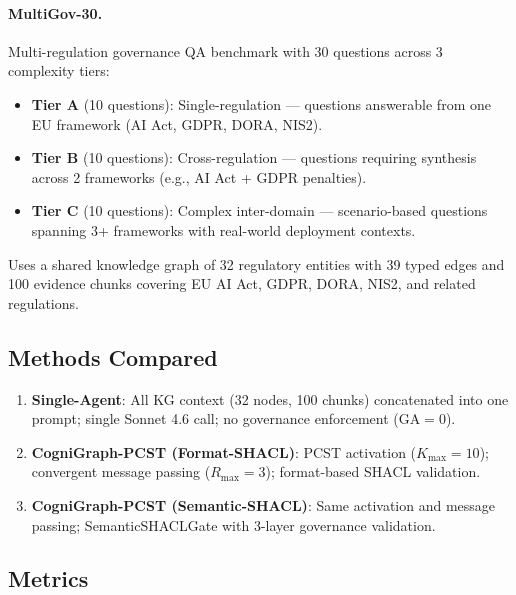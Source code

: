 \documentclass[a4paper,11pt]{article}
\theoremstyle{definition}
\begin{document}
\paragraph{MultiGov-30.}
Multi-regulation governance QA benchmark with 30 questions across 3 complexity tiers:
\begin{itemize}
\item \textbf{Tier A} (10 questions): Single-regulation --- questions answerable from one EU framework (AI Act, GDPR, DORA, NIS2).
\item \textbf{Tier B} (10 questions): Cross-regulation --- questions requiring synthesis across 2 frameworks (e.g., AI Act + GDPR penalties).
\item \textbf{Tier C} (10 questions): Complex inter-domain --- scenario-based questions spanning 3+ frameworks with real-world deployment contexts.
\end{itemize}
Uses a shared knowledge graph of 32 regulatory entities with 39 typed edges and 100 evidence chunks covering EU AI Act, GDPR, DORA, NIS2, and related regulations.

\subsection{Methods Compared}

\begin{enumerate}
\item \textbf{Single-Agent}: All KG context (32 nodes, 100 chunks) concatenated into one prompt; single Sonnet 4.6 call; no governance enforcement ($\mathrm{GA}=0$).
\item \textbf{CogniGraph-PCST (Format-SHACL)}: PCST activation ($K_{\max}=10$); convergent message passing ($R_{\max}=3$); format-based SHACL validation.
\item \textbf{CogniGraph-PCST (Semantic-SHACL)}: Same activation and message passing; SemanticSHACLGate with 3-layer governance validation.
\end{enumerate}

\subsection{Metrics}
\end{document}
